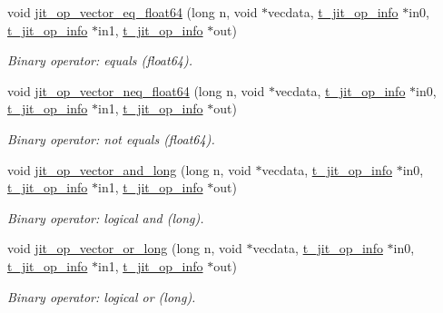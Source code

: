 \begin{DoxyCompactItemize}
void \hyperlink{group__opvecmod_gaffe37d753be49e02a1c4b44beff9f1cd}{jit\_\-op\_\-vector\_\-eq\_\-float64} (long n, void $\ast$vecdata, \hyperlink{structt__jit__op__info}{t\_\-jit\_\-op\_\-info} $\ast$in0, \hyperlink{structt__jit__op__info}{t\_\-jit\_\-op\_\-info} $\ast$in1, \hyperlink{structt__jit__op__info}{t\_\-jit\_\-op\_\-info} $\ast$out)
\begin{DoxyCompactList}\small\item\em Binary operator: equals (float64). \item\end{DoxyCompactList}\item 
void \hyperlink{group__opvecmod_ga2865fb03ed572a6cf1034f150217784d}{jit\_\-op\_\-vector\_\-neq\_\-float64} (long n, void $\ast$vecdata, \hyperlink{structt__jit__op__info}{t\_\-jit\_\-op\_\-info} $\ast$in0, \hyperlink{structt__jit__op__info}{t\_\-jit\_\-op\_\-info} $\ast$in1, \hyperlink{structt__jit__op__info}{t\_\-jit\_\-op\_\-info} $\ast$out)
\begin{DoxyCompactList}\small\item\em Binary operator: not equals (float64). \item\end{DoxyCompactList}\item 
void \hyperlink{group__opvecmod_ga2151258ba2425ee38eefff33f6d88ae0}{jit\_\-op\_\-vector\_\-and\_\-long} (long n, void $\ast$vecdata, \hyperlink{structt__jit__op__info}{t\_\-jit\_\-op\_\-info} $\ast$in0, \hyperlink{structt__jit__op__info}{t\_\-jit\_\-op\_\-info} $\ast$in1, \hyperlink{structt__jit__op__info}{t\_\-jit\_\-op\_\-info} $\ast$out)
\begin{DoxyCompactList}\small\item\em Binary operator: logical and (long). \item\end{DoxyCompactList}\item 
void \hyperlink{group__opvecmod_gab2f7a15d7c4057dc2e3a348525b6b240}{jit\_\-op\_\-vector\_\-or\_\-long} (long n, void $\ast$vecdata, \hyperlink{structt__jit__op__info}{t\_\-jit\_\-op\_\-info} $\ast$in0, \hyperlink{structt__jit__op__info}{t\_\-jit\_\-op\_\-info} $\ast$in1, \hyperlink{structt__jit__op__info}{t\_\-jit\_\-op\_\-info} $\ast$out)
\begin{DoxyCompactList}\small\item\em Binary operator: logical or (long). \item\end{DoxyCompactList}\item 

\end{DoxyCompactItemize}
